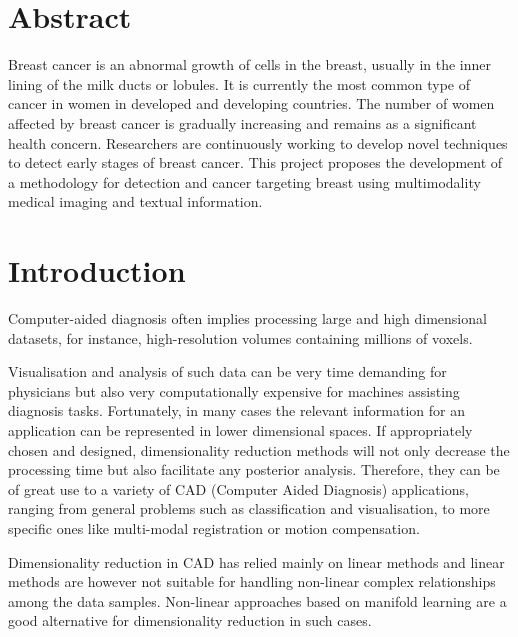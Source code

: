 \begin{titlepage}

\vfill %

\end{titlepage}

\section{Abstract}

Breast cancer is an abnormal growth of cells in the breast, usually in the inner lining of the milk ducts or lobules. It is currently the most common type of cancer in women in developed and developing countries. The number of women affected by breast cancer is gradually increasing and remains as a significant health concern. Researchers are continuously working to develop novel techniques to detect early stages of breast cancer. This project proposes the development of a methodology for detection and cancer targeting breast using multimodality medical imaging and textual information.

\section{Introduction}

Computer-aided  diagnosis  often  implies  processing large and high dimensional datasets, for instance, high-resolution volumes containing millions of voxels.

Visualisation and analysis of such data can be very time demanding for physicians but also very computationally expensive for machines assisting diagnosis tasks. Fortunately, in many cases the relevant information for an application can be represented in lower dimensional spaces. If appropriately  chosen and designed, dimensionality reduction methods will not only decrease the processing time but also facilitate any posterior analysis. Therefore, they can be of great use to a variety of CAD (Computer Aided Diagnosis)  applications, ranging  from  general problems such as classification and visualisation, to more specific ones like multi-modal registration or motion compensation.

Dimensionality reduction in CAD has relied mainly on linear methods and linear  methods  are  however not suitable for handling non-linear complex relationships among the data samples. Non-linear approaches based on manifold learning are a good alternative for dimensionality reduction in such cases.

